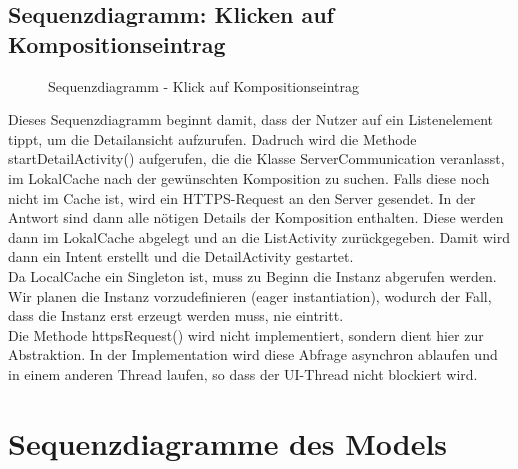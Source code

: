 \subsection*{Sequenzdiagramm: Klicken auf Kompositionseintrag}

\begin{figure}[h]
	\centering
	\caption{Sequenzdiagramm - Klick auf Kompositionseintrag}
	\label{fig:sequenz-a}
\end{figure}
\noindent
Dieses Sequenzdiagramm beginnt damit, dass der Nutzer auf ein Listenelement tippt, um die Detailansicht aufzurufen. 
Dadruch wird die Methode startDetailActivity() aufgerufen, die die Klasse ServerCommunication veranlasst, im LokalCache nach der gewünschten Komposition zu suchen.
Falls diese noch nicht im Cache ist, wird ein HTTPS-Request an den Server gesendet.
In der Antwort sind dann alle nötigen Details der Komposition enthalten.
Diese werden dann im LokalCache abgelegt und an die ListActivity zurückgegeben.
Damit wird dann ein Intent erstellt und die DetailActivity gestartet.
\\
Da LocalCache ein Singleton ist, muss zu Beginn die Instanz abgerufen werden. Wir planen die Instanz vorzudefinieren (eager instantiation), wodurch der Fall, dass die Instanz erst erzeugt werden muss, nie eintritt.
\\
Die Methode httpsRequest() wird nicht implementiert, sondern dient hier zur Abstraktion. In der Implementation wird diese Abfrage asynchron ablaufen und in einem anderen Thread laufen, so dass der UI-Thread nicht blockiert wird. 

\section*{Sequenzdiagramme des Models}

